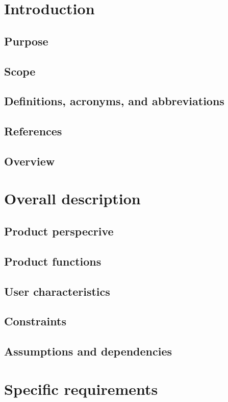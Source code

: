 \documentclass[12pt]{article}
\begin{document}
\tableofcontents{}

\section{Introduction}
\subsection{Purpose}
\subsection{Scope}
\subsection{Definitions, acronyms, and abbreviations}
\subsection{References}
\subsection{Overview}
\section{Overall description}
\subsection{Product perspecrive}
\subsection{Product functions}
\subsection{User characteristics}
\subsection{Constraints}
\subsection{Assumptions and dependencies}
\section{Specific requirements}
\end{document}
